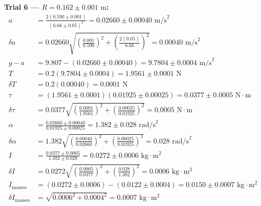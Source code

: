 \documentclass[11pt]{article}
\begin{document}
\textbf{Trial 6 — $R = 0.162 \pm 0.001\text{ m}$:}
\begin{align*}
a &= \frac{2(0.590 \pm 0.001)}{(6.66 \pm 0.05)^2} = 0.02660 \pm 0.00040\text{ m/s}^2 \\
\delta a &= 0.02660\sqrt{\left(\frac{0.001}{0.590}\right)^2 + \left(\frac{2(0.05)}{6.66}\right)^2} = 0.00040\text{ m/s}^2 \\
g - a &= 9.807 - (0.02660 \pm 0.00040) = 9.7804 \pm 0.0004\text{ m/s}^2 \\
T &= 0.2(9.7804 \pm 0.0004) = 1.9561 \pm 0.0001\text{ N} \\
\delta T &= 0.2(0.00040) = 0.0001\text{ N} \\
\tau &= (1.9561 \pm 0.0001)(0.01925 \pm 0.00025) = 0.0377 \pm 0.0005\text{ N}\cdot\text{m} \\
\delta\tau &= 0.0377\sqrt{\left(\frac{0.0001}{1.9561}\right)^2 + \left(\frac{0.00025}{0.01925}\right)^2} = 0.0005\text{ N}\cdot\text{m} \\
\alpha &= \frac{0.02660 \pm 0.00040}{0.01925 \pm 0.00025} = 1.382 \pm 0.028\text{ rad/s}^2 \\
\delta\alpha &= 1.382\sqrt{\left(\frac{0.00040}{0.02660}\right)^2 + \left(\frac{0.00025}{0.01925}\right)^2} = 0.028\text{ rad/s}^2 \\
I &= \frac{0.0377 \pm 0.0005}{1.382 \pm 0.028} = 0.0272 \pm 0.0006\text{ kg}\cdot\text{m}^2 \\
\delta I &= 0.0272\sqrt{\left(\frac{0.0005}{0.0377}\right)^2 + \left(\frac{0.028}{1.382}\right)^2} = 0.0006\text{ kg}\cdot\text{m}^2 \\
I_{\text{masses}} &= (0.0272 \pm 0.0006) - (0.0122 \pm 0.0004) = 0.0150 \pm 0.0007\text{ kg}\cdot\text{m}^2 \\
\delta I_{\text{masses}} &= \sqrt{0.0006^2 + 0.0004^2} = 0.0007\text{ kg}\cdot\text{m}^2
\end{align*}
\end{document}
